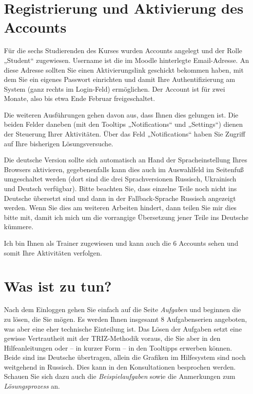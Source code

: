 \documentclass[11pt,a4paper]{article}
\begin{document}
\section{Registrierung und Aktivierung des Accounts}

Für die sechs Studierenden des Kurses wurden Accounts angelegt und der Rolle
„Student“ zugewiesen. Username ist die im Moodle hinterlegte Email-Adresse.
An diese Adresse sollten Sie einen Aktivierungslink geschickt bekommen haben,
mit dem Sie ein eigenes Passwort einrichten und damit Ihre Authentifizierung
am System (ganz rechts im Login-Feld) ermöglichen.  Der Account ist für zwei
Monate, also bis etwa Ende Februar freigeschaltet. 

Die weiteren Ausführungen gehen davon aus, dass Ihnen dies gelungen ist.  Die
beiden Felder daneben (mit den Tooltips „Notifications“ und „Settings“) dienen
der Steuerung Ihrer Aktivitäten. Über das Feld „Notifications“ haben Sie
Zugriff auf Ihre bisherigen Lösungsversuche.

Die deutsche Version sollte sich automatisch an Hand der Spracheinstellung
Ihres Browsers aktivieren, gegebenenfalls kann dies auch im Auswahlfeld im
Seitenfuß umgeschaltet werden (dort sind die drei Sprachversionen Russisch,
Ukrainisch und Deutsch verfügbar).  Bitte beachten Sie, dass einzelne Teile
noch nicht ins Deutsche übersetzt sind und dann in der Fallback-Sprache
Russisch angezeigt werden. Wenn Sie dies am weiteren Arbeiten hindert, dann
teilen Sie mir dies bitte mit, damit ich mich um die vorrangige Übersetzung
jener Teile ins Deutsche kümmere.

Ich bin Ihnen als Trainer zugewiesen und kann auch die 6 Accounts sehen und
somit Ihre Aktivitäten verfolgen. 

\section{Was ist zu tun?}

Nach dem Einloggen gehen Sie einfach auf die Seite \emph{Aufgaben} und
beginnen die zu lösen, die Sie mögen.  Es werden Ihnen insgesamt 8
Aufgabenserien angeboten, was aber eine eher technische Einteilung ist.  Das
Lösen der Aufgaben setzt eine gewisse Vertrautheit mit der TRIZ-Methodik
voraus, die Sie aber in den Hilfeanleitungen oder -- in kurzer Form -- in den
Tooltipps erwerben können. Beide sind ins Deutsche übertragen, allein die
Grafiken im Hilfesystem sind noch weitgehend in Russisch. Dies kann in den
Konsultationen besprochen werden.  Schauen Sie sich dazu auch die
\emph{Beispielaufgaben} sowie die Anmerkungen zum \emph{Lösungsprozess} an.
\end{document}
